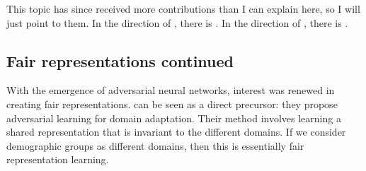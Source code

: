 
This topic has since received more contributions than I can explain here,
so I will just point to them.
In the direction of \citet{zafar2017fairnessconstraints}, there is \citet{quadrianto2017recycling,lohaus2020too}.
In the direction of \citet{kamiran2012data}, there is \citet{AgaBeyDudLanetal18,roh2021fairbatch}.

\subsection{Fair representations continued}
With the emergence of adversarial neural networks, interest was renewed in creating fair representations.
\citet{ganin2016domain} can be seen as a direct precursor:
they propose adversarial learning for domain adaptation.
Their method involves learning a shared representation that is invariant to the different domains.
If we consider demographic groups as different domains, then this is essentially fair representation learning.

